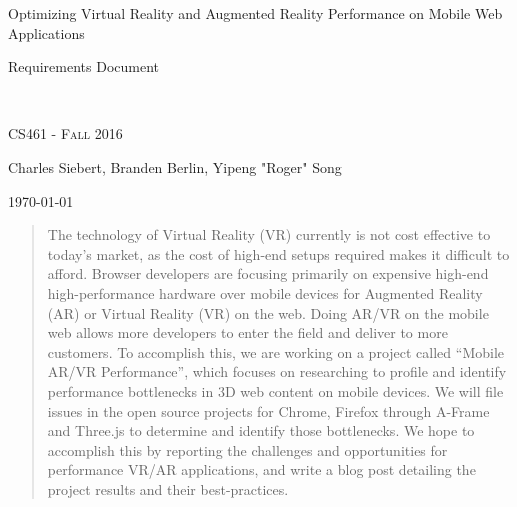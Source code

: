 \documentclass[letterpaper,10pt,draftclsnofoot,onecolumn,compsoc]{IEEEtran}
\def\name{Charles Siebert, Branden Berlin, Yipeng "Roger" Song}
\begin{document}
\begin{titlepage}
\centering
\vspace*{6cm}
{\scshape\LARGE \begin{singlespace}Optimizing Virtual Reality and Augmented Reality Performance on Mobile Web Applications \\ \end{singlespace} Requirements Document } \\
	{\scshape\Large CS461 - Fall 2016 \par}
	\vspace{.5cm}
	\name \par
    {\large \today \par} 
	\vspace*{1cm}
	
\begin{abstract}
The technology of Virtual Reality (VR) currently is not cost effective to today's market, as the cost of high-end setups required makes it difficult to afford. Browser developers are focusing primarily on expensive high-end high-performance hardware over mobile devices for Augmented Reality (AR) or Virtual Reality (VR) on the web. Doing AR/VR on the mobile web allows more developers to enter the field and deliver to more customers. To accomplish this, we are working on a project called “Mobile AR/VR Performance”, which focuses on researching to profile and identify performance bottlenecks in 3D web content on mobile devices. We will file issues in the open source projects for Chrome, Firefox through A-Frame and Three.js to determine and identify those bottlenecks. We hope to accomplish this by reporting the challenges and opportunities for performance VR/AR applications, and write a blog post detailing the project results and their best-practices.
\end{abstract}

\end{titlepage}

\newpage

\tableofcontents

\thispagestyle{empty}

\newpage
\end{document}
